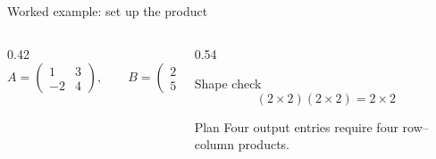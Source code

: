 \begin{frame}{Worked example: set up the product}
  \begin{columns}[T,onlytextwidth]
    \begin{column}{0.42\textwidth}
      \[
      A=\begin{pmatrix}1&3\\-2&4\end{pmatrix},\qquad
      B=\begin{pmatrix}2&0\\5&-1\end{pmatrix}
      \]
    \end{column}
    \begin{column}{0.54\textwidth}
      \begin{block}{Shape check}
        \[
        (2\times2)(2\times2)=2\times2
        \]
      \end{block}
      \begin{exampleblock}{Plan}
        Four output entries require four row--column products.
      \end{exampleblock}
    \end{column}
  \end{columns}
\end{frame}
